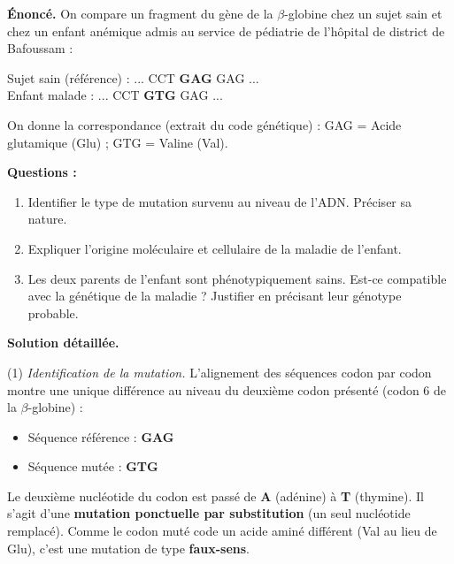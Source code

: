 \documentclass[11pt]{article}
\begin{document}
\begin{exoresolu}
\textbf{Énoncé.} On compare un fragment du gène de la $\beta$-globine chez un sujet sain et chez un enfant anémique admis au service de pédiatrie de l'hôpital de district de Bafoussam :

Sujet sain (référence) : ... CCT \textbf{GAG} GAG ... \\
Enfant malade : \hphantom{Sujet sain (référence) : } ... CCT \textbf{GTG} GAG ...

On donne la correspondance (extrait du code génétique) : GAG = Acide glutamique (Glu) ; GTG = Valine (Val).

\textbf{Questions :}
\begin{enumerate}
\item Identifier le type de mutation survenu au niveau de l'ADN. Préciser sa nature.
\item Expliquer l'origine moléculaire et cellulaire de la maladie de l'enfant.
\item Les deux parents de l'enfant sont phénotypiquement sains. Est-ce compatible avec la génétique de la maladie ? Justifier en précisant leur génotype probable.
\end{enumerate}

\tcblower
\textbf{Solution détaillée.}

(1) \emph{Identification de la mutation.}
L'alignement des séquences codon par codon montre une unique différence au niveau du deuxième codon présenté (codon 6 de la $\beta$-globine) :
\begin{itemize}
\item Séquence référence : \textbf{GAG}
\item Séquence mutée : \textbf{GTG}
\end{itemize}
Le deuxième nucléotide du codon est passé de \textbf{A} (adénine) à \textbf{T} (thymine). Il s'agit d'une \textbf{mutation ponctuelle par substitution} (un seul nucléotide remplacé). Comme le codon muté code un acide aminé différent (Val au lieu de Glu), c'est une mutation de type \textbf{faux-sens}.


\end{exoresolu}
\end{document}
